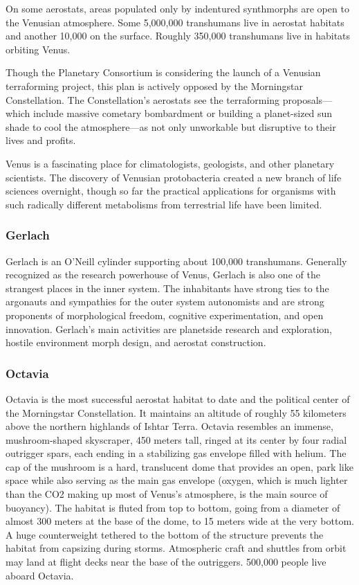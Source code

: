 On some aerostats, areas populated only by indentured synthmorphs are open to the Venusian atmosphere. Some 5,000,000 transhumans live in aerostat 
habitats and another 10,000 on the surface. Roughly 
350,000 transhumans live in habitats orbiting Venus.

Though the Planetary Consortium is considering 
the launch of a Venusian terraforming project, this 
plan is actively opposed by the Morningstar Constellation. The Constellation's aerostats see the terraforming proposals—which include massive cometary 
bombardment or building a planet-sized sun shade 
to cool the atmosphere—as not only unworkable but 
disruptive to their lives and profits.

Venus is a fascinating place for climatologists, geologists, and other planetary scientists. The discovery 
of Venusian protobacteria created a new branch of 
life sciences overnight, though so far the practical applications for organisms with such radically different 
metabolisms from terrestrial life have been limited.

\subsubsection{Gerlach}

Gerlach is an O'Neill cylinder supporting about 
100,000 transhumans. Generally recognized as 
the research powerhouse of Venus, Gerlach is also 
one of the strangest places in the inner system. The 
inhabitants have strong ties to the argonauts and 
sympathies for the outer system autonomists and 
are strong proponents of morphological freedom, 
cognitive experimentation, and open innovation. 
Gerlach's main activities are planetside research and 
exploration, hostile environment morph design, and 
aerostat construction.

\subsubsection{Octavia}

Octavia is the most successful aerostat habitat to date 
and the political center of the Morningstar Constellation. It maintains an altitude of roughly 55 kilometers 
above the northern highlands of Ishtar Terra. Octavia 
resembles an immense, mushroom-shaped skyscraper, 
450 meters tall, ringed at its center by four radial 
outrigger spars, each ending in a stabilizing gas envelope filled with helium. The cap of the mushroom 
is a hard, translucent dome that provides an open, 
park like space while also serving as the main gas envelope (oxygen, which is much lighter than the CO2 
making up most of Venus's atmosphere, is the main 
source of buoyancy). The habitat is fluted from top to 
bottom, going from a diameter of almost 300 meters 
at the base of the dome, to 15 meters wide at the very 
bottom. A huge counterweight tethered to the bottom 
of the structure prevents the habitat from capsizing 
during storms. Atmospheric craft and shuttles from 
orbit may land at flight decks near the base of the 
outriggers. 500,000 people live aboard Octavia. 

